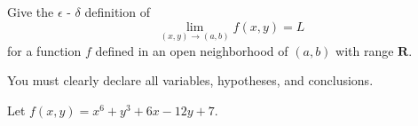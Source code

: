 \documentclass[addpoints]{exam}
\begin{document}
\begin{questions}
\question[20] Give the $\epsilon$ - $\delta$ definition of 
\[
	\lim _{(x,y) \to (a,b)} f(x,y) = L
\]
for a function $f$ defined in an open neighborhood of $(a,b)$ with range $\mathbf{R}$. 

You must clearly declare all variables, hypotheses, and conclusions. 

\question Let $f(x,y) = x^6 + y^3 + 6x - 12y + 7$.

\end{questions}
\end{document}
